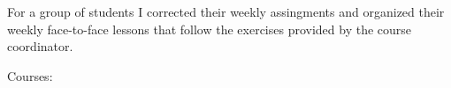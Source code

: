 For a group of students I corrected their weekly assingments and organized their
weekly face-to-face lessons that follow the exercises provided by the course
coordinator.

\medskip

Courses:
\parbox[t]{25em} {
}
